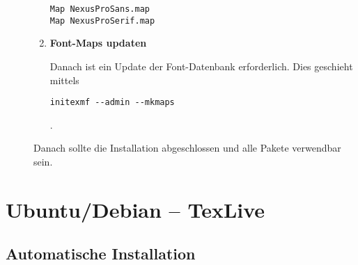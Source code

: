 \begin{description}
\begin{enumerate}
      \begin{lstlisting}[style=file]
Map NexusProSans.map
Map NexusProSerif.map
      \end{lstlisting}

      \item {\bfseries Font-Maps updaten}

        Danach ist ein Update der Font-Datenbank erforderlich. Dies geschieht
        mittels
        \begin{lstlisting}[style=cmd]
initexmf --admin --mkmaps
        \end{lstlisting}
        .

    \end{enumerate}

    Danach sollte die Installation abgeschlossen und alle Pakete verwendbar 
    sein.
\end{description}


\clearpage
\section{Ubuntu/Debian -- TexLive}

\subsection{Automatische Installation}

